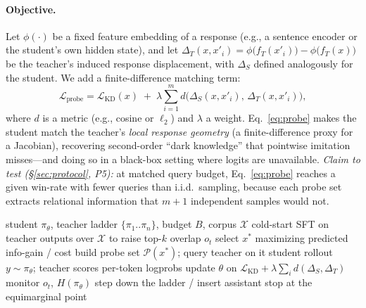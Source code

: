 \documentclass[11pt]{article}
\begin{document}
\paragraph{Objective.} Let $\phi(\cdot)$ be a fixed feature embedding of a response (e.g., a sentence encoder or the student's own hidden state), and let $\Delta_T(x,x'_i)=\phi\!\big(f_T(x'_i)\big)-\phi\!\big(f_T(x)\big)$ be the teacher's induced response displacement, with $\Delta_S$ defined analogously for the student. We add a finite-difference matching term:
\begin{equation}
\mathcal{L}_{\text{probe}}
=\mathcal{L}_{\text{KD}}(x)\;+\;\lambda\sum_{i=1}^{m} d\!\Big(\Delta_S(x,x'_i),\,\Delta_T(x,x'_i)\Big),
\label{eq:probe}
\end{equation}
where $d$ is a metric (e.g., cosine or $\ell_2$) and $\lambda$ a weight. Eq.~\eqref{eq:probe} makes the student match the teacher's \emph{local response geometry} (a finite-difference proxy for a Jacobian), recovering second-order ``dark knowledge'' that pointwise imitation misses---and doing so in a black-box setting where logits are unavailable. \emph{Claim to test (\S\ref{sec:protocol}, P5):} at matched query budget, Eq.~\eqref{eq:probe} reaches a given win-rate with fewer queries than i.i.d.\ sampling, because each probe set extracts relational information that $m{+}1$ independent samples would not.

\begin{algorithm}[t]
\caption{MIDAS (one outer round)}
\label{alg:midas}
\begin{algorithmic}[1]
\REQUIRE student $\pi_\theta$, teacher ladder $\{\pi_1..\pi_n\}$, budget $B$, corpus $\mathcal{X}$
\STATE cold-start SFT on teacher outputs over $\mathcal{X}$ to raise top-$k$ overlap $o_t$
  \STATE select $x^\ast$ maximizing predicted info-gain / cost  
  \STATE build probe set $\mathcal{P}(x^\ast)$; query teacher on it
  \STATE student rollout $y\sim\pi_\theta$; teacher scores per-token logprobs
  \STATE update $\theta$ on $\mathcal{L}_{\text{KD}} + \lambda\sum_i d(\Delta_S,\Delta_T)$  
  \STATE monitor $o_t$, $H(\pi_\theta)$
     \STATE step down the ladder / insert assistant  
  \ENDIF
\ENDWHILE
\STATE stop at the equimarginal point  
\end{algorithmic}
\end{algorithm}
\end{document}
